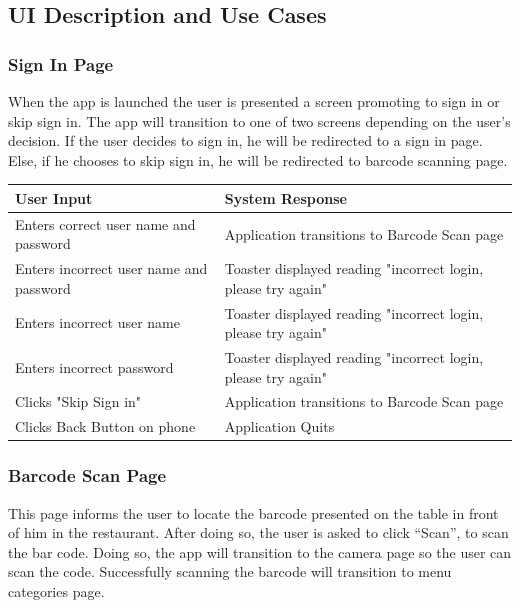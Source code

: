 \documentclass[12pt, titlepage]{article}
\begin{document}
\subsection{UI Description and Use Cases}

\subsubsection{Sign In Page}

When the app is launched the user is presented a screen promoting to sign in or skip sign in. The app will transition to one of two screens depending on the user’s decision. If the user decides to sign in, he will be redirected to a sign in page. Else, if he chooses to skip sign in, he will be redirected to barcode scanning page.


\begin{center}
    \begin{tabular}{ | l | p{8cm} |}
    \hline
    User Input & System Response \\ \hline
    Enters correct user name and password & Application transitions to Barcode Scan page \\ \hline
    Enters incorrect user name and password & Toaster displayed reading "incorrect login, please try again" \\ \hline
    Enters incorrect user name & Toaster displayed reading "incorrect login, please try again" \\ \hline
    Enters incorrect password & Toaster displayed reading "incorrect login, please try again" \\ \hline
    Clicks "Skip Sign in" & Application  transitions to Barcode Scan page\\ \hline
    Clicks Back Button on phone & Application Quits \\
    \hline
    \end{tabular}
\end{center}


\subsubsection{Barcode Scan Page}

This page informs the user to locate the barcode presented on the table in front of him in the restaurant.  After doing so, the user is asked to click “Scan”, to scan the bar code. Doing so, the app will transition to the camera page so the user can scan the code. Successfully scanning the barcode will transition to menu categories page. 
\end{document}
